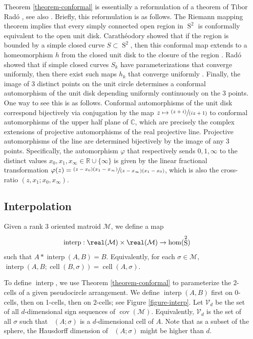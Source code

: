 \documentclass[JEP,XML,SOM,Unicode,NoFloatCountersInSection,published]{cedram}
\newcommand{\pspfrac}[2]{\sfrac{(#1)}{(#2)}}
\newcommand\mto{\mathchoice{\longmapsto}{\mapsto}{\mapsto}{\mapsto}}
\theoremstyle{remark}
\let\mc\mathcal
\let\mb\mathbb
\DeclareMathOperator{\sphere}{S}
\DeclareMathOperator{\cell}{cell}
\DeclareMathOperator{\Cell}{\overline{cell}}
\DeclareMathOperator{\interp}{interp}
\DeclareMathOperator{\cov}{cov}
\begin{document}
Theorem \ref{theorem-conformal} is essentially a reformulation of a theorem of Tibor Radó \cite{rado1923representation}, see also \cite[\S II.5 Th.\,2]{goluzin1969geometric}. Briefly, this reformulation is as follows.
The Riemann mapping theorem implies that every simply connected open region in $\sphere^2$ is conformally equivalent to the open unit disk. Carathéodory showed that if the region is bounded by a simple closed curve $S \subset \sphere^2$, then this conformal map extends to a homeomorphism $h$ from the closed unit disk to the closure of the region \cite{caratheodory1913gegenseitige}. Radó showed that if simple closed curves $S_k$ have parameterizations that converge uniformly, then there exist such maps $h_k$ that converge uniformly \cite{rado1923representation}. Finally, the image of $3$ distinct points on the unit circle determines a conformal automorphism of the unit disk depending uniformly continuously on the $3$ points. One way to see this is as follows. Conformal automorphisms of the unit disk correspond bijectively via conjugation by the map $z \mto \pspfrac{z+i}{iz+1}$ to conformal automorphisms of the upper half plane of $\mb{C}$,
which are precisely the complex extensions of projective automorphisms of the real projective line. Projective automorphisms of the line are determined bijectively by the image of any $3$ points.
Specifically, the automorphism $\varphi$ that respectively sends $0,1,\infty$ to the distinct values $x_0,x_1,x_\infty \in \mb{R}\cup\{\infty\}$ is given by the linear fractional transformation
$\varphi(z) = \sfrac{(z-x_0)(x_1-x_\infty)}{(z-x_\infty)(x_1-x_0)}$, which is also the cross-ratio $(z,x_1;x_0,x_\infty)$.

\subsection{Interpolation}

Given a rank $3$ oriented matroid $\mc{M}$, we define a map
\[ \interp : \real(\mc{M}) \times \real(\mc{M}) \to \hom(\sphere^2) \]
such that $A*\interp(A,B)\!=\! B$.
Equivalently, for each $\sigma \!\in\! \mc{M}$, $\interp(A,B;\cell(B,\sigma))\!=\!\cell(A,\sigma)$.

To define $\interp$, we use Theorem \ref{theorem-conformal} to parameterize the $2$-cells of a given pseudocircle arrangement.
We define $\interp(A,B)$ first on 0-cells, then on 1-cells, then on $2$-cells; see Figure \ref{figure-interp}. Let $\mc{V}_d$ be the set of all $d$-dimensional sign sequences of $\cov(\mc{M})$. Equivalently, $\mc{V}_d$ is the set of all $\sigma$ such that $\Cell(A;\sigma)$ is a $d$-dimensional cell of $A$.
Note that as a subset of the sphere, the Hausdorff dimension of $\Cell(A;\sigma)$ might be higher than $d$.
\end{document}
